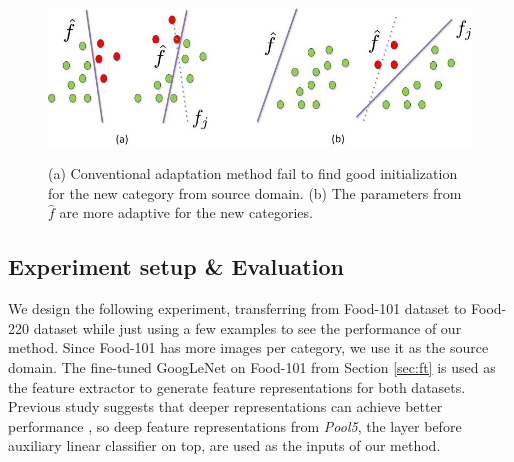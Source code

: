 \begin{figure}
  \centering
  \includegraphics[scale = .6]{fig/domain.jpg}\\
  \caption{(a) Conventional adaptation method fail to find good initialization for the new category from source domain. (b) The parameters from $\hat{f}$ are more adaptive for the new categories.}
  \label{fig:wm}
\end{figure}

\subsection{Experiment setup \& Evaluation}
We design the following experiment, transferring from Food-101 dataset to Food-220 dataset while just using a few examples to see the performance of our method. Since Food-101 has more images per category, we use it as the source domain. The fine-tuned GoogLeNet on Food-101 from Section \ref{sec:ft} is used as the feature extractor to generate feature representations for both datasets. Previous study suggests that deeper representations can achieve better performance \cite{hoffman2013one}, so deep feature representations from \emph{Pool5}, the layer before auxiliary linear classifier on top, are used as the inputs of our method.


